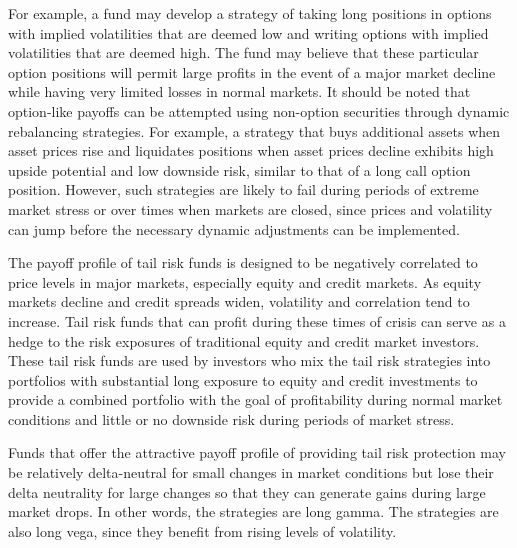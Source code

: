 \documentclass[11pt]{article}
\begin{document}
For example, a fund may develop a strategy of taking long positions in options with implied volatilities that are deemed low and writing options with implied volatilities that are deemed high. The fund may believe that these particular option positions will permit large profits in the event of a major market decline while having very limited losses in normal markets. It should be noted that option-like payoffs can be attempted using non-option securities through dynamic rebalancing strategies. For example, a strategy that buys additional assets when asset prices rise and liquidates positions when asset prices decline exhibits high upside potential and low downside risk, similar to that of a long call option position. However, such strategies are likely to fail during periods of extreme market stress or over times when markets are closed, since prices and volatility can jump before the necessary dynamic adjustments can be implemented.

The payoff profile of tail risk funds is designed to be negatively correlated to price levels in major markets, especially equity and credit markets. As equity markets decline and credit spreads widen, volatility and correlation tend to increase. Tail risk funds that can profit during these times of crisis can serve as a hedge to the risk exposures of traditional equity and credit market investors. These tail risk funds are used by investors who mix the tail risk strategies into portfolios with substantial long exposure to equity and credit investments to provide a combined portfolio with the goal of profitability during normal market conditions and little or no downside risk during periods of market stress.

Funds that offer the attractive payoff profile of providing tail risk protection may be relatively delta-neutral for small changes in market conditions but lose their delta neutrality for large changes so that they can generate gains during large market drops. In other words, the strategies are long gamma. The strategies are also long vega, since they benefit from rising levels of volatility.
\end{document}
